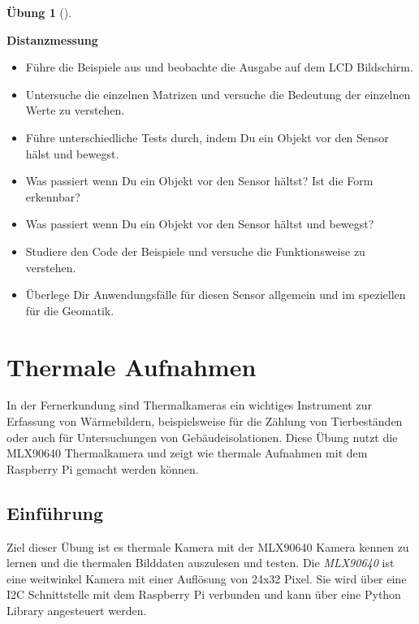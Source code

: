 \documentclass[
  11pt,
  a4paperpaper,
  oneside, openany  ,captions=tableheading
]{scrbook}
\providecommand{\tightlist}{%
  \setlength{\itemsep}{0pt}\setlength{\parskip}{0pt}}
\theoremstyle{definition}
\newtheorem{exercise}{Übung}[chapter]
\theoremstyle{remark}
\begin{document}
\begin{exercise}[]\protect\hypertarget{exr-distanzmessung-LCD}{}\label{exr-distanzmessung-LCD}

\textbf{Distanzmessung}

\begin{itemize}
\tightlist
\item
  Führe die Beispiele aus und beobachte die Ausgabe auf dem LCD
  Bildschirm.
\item
  Untersuche die einzelnen Matrizen und versuche die Bedeutung der
  einzelnen Werte zu verstehen.
\item
  Führe unterschiedliche Tests durch, indem Du ein Objekt vor den Sensor
  hälst und bewegst.
\item
  Was passiert wenn Du ein Objekt vor den Sensor hältst? Ist die Form
  erkennbar?
\item
  Was passiert wenn Du ein Objekt vor den Sensor hältst und bewegst?
\item
  Studiere den Code der Beispiele und versuche die Funktionsweise zu
  verstehen.
\item
  Überlege Dir Anwendungsfälle für diesen Sensor allgemein und im
  speziellen für die Geomatik.
\end{itemize}

\end{exercise}

\chapter{Thermale Aufnahmen}\label{thermale-aufnahmen}

In der Fernerkundung sind Thermalkameras ein wichtiges Instrument zur
Erfassung von Wärmebildern, beispielsweise für die Zählung von
Tierbeständen oder auch für Untersuchungen von Gebäudeisolationen. Diese
Übung nutzt die MLX90640 Thermalkamera und zeigt wie thermale Aufnahmen
mit dem Raspberry Pi gemacht werden können.

\hfill\break

\section{Einführung}\label{einfuxfchrung-4}

Ziel dieser Übung ist es thermale Kamera mit der MLX90640 Kamera kennen
zu lernen und die thermalen Bilddaten auszulesen und testen. Die
\emph{MLX90640} ist eine weitwinkel Kamera mit einer Auflösung von 24x32
Pixel. Sie wird über eine I2C Schnittstelle mit dem Raspberry Pi
verbunden und kann über eine Python Library angesteuert werden.
\end{document}
